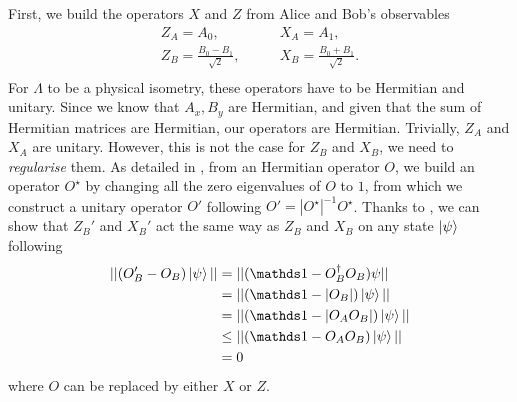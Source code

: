 First, we build the operators $X$ and $Z$ from Alice and Bob's observables
\begin{equation}
	\begin{split}
		Z_A = A_0, \qquad &X_A = A_1, \\
		Z_B = \frac{B_0 - B_1}{\sqrt{2}}, \qquad &X_B = \frac{B_0 + B_1}{\sqrt{2}}. \\ 
	\end{split}
\end{equation}
For $\Lambda$ to be a physical isometry, these operators have to be Hermitian and unitary.
Since we know that $A_x,B_y$ are Hermitian, and given that the sum of Hermitian matrices are Hermitian, our operators are Hermitian.
Trivially, $Z_A$ and $X_A$ are unitary. 
However, this is not the case for $Z_B$ and $X_B$, we need to \textit{regularise} them.
As detailed in \cite{Supic2019}, from an Hermitian operator $O$, we build an operator $O^\star$ by changing all the zero eigenvalues of $O$ to $1$, from which we construct a unitary operator $O'$ following $O'=|O^\star|^{-1} O^\star$.
Thanks to , we can show that $Z_B'$ and $X_B'$ act the same way as $Z_B$ and $X_B$ on any state $\ket{\psi}$ following
\begin{equation}
	\begin{split}
		||(O_B' - O_B) \ket{\psi}|| &= ||(\id - O_B^\dag O_B)\psi|| \\
									&= ||(\id-|O_B|)\ket{\psi}|| \\
									&= ||(\id-|O_A O_B|)\ket{\psi}|| \\
									&\leq ||(\id-O_A O_B)\ket{\psi}|| \\
									&= 0
	\end{split}
\end{equation}
where $O$ can be replaced by either $X$ or $Z$.

